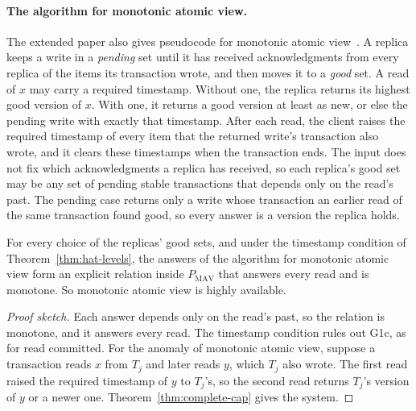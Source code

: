 \paragraph{The algorithm for monotonic atomic view.}
The extended paper also gives pseudocode for monotonic atomic
view~\cite[App.~B]{bailis2013hatextended}.  A replica keeps a write in a
\emph{pending} set until it has received acknowledgments from every replica of
the items its transaction wrote, and then moves it to a \emph{good} set.  A
read of $x$ may carry a required timestamp.  Without one, the replica returns
its highest good version of $x$.  With one, it returns a good version at least
as new, or else the pending write with exactly that timestamp.  After each
read, the client raises the required timestamp of every item that the
returned write's transaction also wrote, and it clears these timestamps when
the transaction ends.  The input does not fix which acknowledgments a
replica has received, so each replica's good set may be any set of pending
stable transactions that depends only on the read's past.  The pending case
returns only a write whose transaction an earlier read of the same transaction
found good, so every answer is a version the replica holds.

\begin{proposition}
\label{prop:hat-mav-algorithm}
For every choice of the replicas' good sets, and under the timestamp condition
of Theorem~\ref{thm:hat-levels}, the answers of the algorithm for monotonic
atomic view form an explicit relation inside $P_{\mathrm{MAV}}$ that answers
every read and is monotone.  So monotonic atomic view is highly available.
\end{proposition}

\begin{proof}[Proof sketch]
Each answer depends only on the read's past, so the relation is monotone, and
it answers every read.  The timestamp condition rules out G1c, as for read
committed.  For the anomaly of monotonic atomic view, suppose a transaction
reads $x$ from $T_j$ and later reads $y$, which $T_j$ also wrote.  The first
read raised the required timestamp of $y$ to $T_j$'s, so the second read
returns $T_j$'s version of $y$ or a newer one.  Theorem~\ref{thm:complete-cap}
gives the system.
\end{proof}

